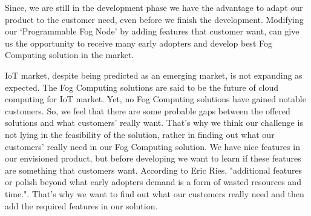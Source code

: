 Since, we are still in the development phase we have the advantage to adapt our product to the customer need, even before we finish the development. Modifying our `Programmable Fog Node' by adding features that customer want, can give us the opportunity to receive many early adopters and develop best Fog Computing solution in the market. 



\ac{IoT} market, despite being predicted as an emerging market, is not expanding as expected. The Fog Computing solutions are said to be the future \citep{fogisfuture} of cloud computing for \ac{IoT} market. Yet, no Fog Computing solutions have gained notable customers. So, we feel that there are some probable gaps between the offered solutions and what customers' really want. That's why we think our challenge is not lying in the feasibility of the solution, rather in finding out what our customers' really need in our Fog Computing solution. We have nice features in our envisioned product, but before developing we want to learn if these features are something that customers want. According to Eric Ries, "additional features or polish beyond what early adopters demand is a form of wasted resources and time."\cite[p.~87]{leanstartup}. That's why we want to find out what our customers really need and then add the required features in our solution. %





